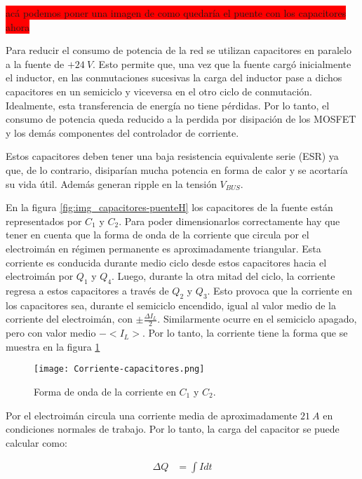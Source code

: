 \colorbox{red}{acá podemos poner una imagen de como quedaría el puente con los capacitores ahora}


\noindent Para reducir el consumo de potencia de la red se utilizan capacitores en paralelo a la fuente de $+24\:V$. Esto permite que, una vez que la fuente cargó inicialmente el inductor, en las conmutaciones sucesivas la carga del inductor pase a dichos capacitores en un semiciclo y viceversa en el otro ciclo de conmutación. Idealmente, esta transferencia de energía no tiene pérdidas. Por lo tanto, el consumo de potencia queda reducido a la perdida por disipación de los MOSFET y los demás componentes del controlador de corriente. 

\noindent Estos capacitores deben tener una baja resistencia equivalente serie (ESR) ya que, de lo contrario, disiparían mucha potencia en forma de calor y se acortaría su vida útil. Además generan ripple en la tensión $V_{BUS}$.

\noindent En la figura \ref{fig:img_capacitores-puenteH} los capacitores de la fuente están representados por $C_1$ y $C_2$. Para poder dimensionarlos correctamente hay que tener en cuenta que la forma de onda de la corriente que circula por el electroimán en régimen permanente es aproximadamente triangular. Esta corriente es conducida durante medio ciclo desde estos capacitores hacia el electroimán por $Q_1$ y $Q_4$. Luego, durante la otra mitad del ciclo, la corriente regresa a estos capacitores a través de $Q_2$ y $Q_3$. Esto provoca que la corriente en los capacitores sea, durante el semiciclo encendido, igual al valor medio de la corriente del electroimán, con $ \pm \frac{\Delta I_L}{2}$. Similarmente ocurre en el semiciclo apagado, pero con valor medio $-<I_L>$.  Por lo tanto,  la corriente tiene la forma que se muestra en la figura \ref{fig:img_ccorriente-capacitores}

\begin{figure}[H]
	\centering
	\texttt{[image: Corriente-capacitores.png]}
	\caption{Forma de onda de la corriente en $C_1$ y $C_2$.}
	\label{fig:img_ccorriente-capacitores}
\end{figure}

\noindent Por el electroimán circula una corriente media de aproximadamente $21\:A$ en condiciones normales de trabajo. Por lo tanto, la carga del capacitor se puede calcular como:

\begin{equation} 
	\begin{aligned}
		\Delta Q &= \int I dt\\	
	\end{aligned}
\end{equation}

